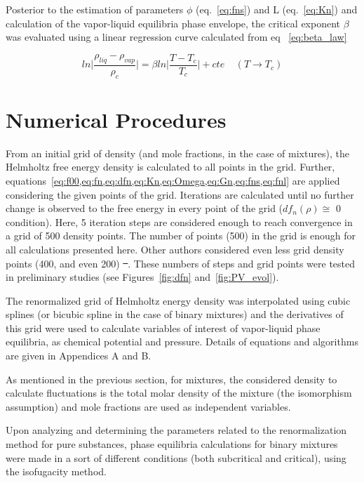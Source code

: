 \documentclass[preprint,12pt,3p]{elsarticle}
\providecommand{\DIFdel}[1]{{\protect\color{red}\sout{#1}}}                      %
\providecommand{\DIFdelbegin}{} %
\providecommand{\DIFdelend}{} %
\begin{document}
    Posterior to the estimation of parameters $\phi$ (eq.~\ref{eq:fns}) and L (eq.~\ref{eq:Kn}) and calculation of the vapor-liquid equilibria phase envelope, the critical exponent $\beta$ was evaluated using a linear regression curve calculated from eq ~\ref{eq:beta_law}

\begin{equation} \label{eq:beta_law}
    ln\Bigg|\frac{\rho_{liq}-\rho_{vap}}{\rho_{c}}\Bigg| = \beta ln\Bigg|\frac{T-T_{c}}{T_{c}}\Bigg|+cte \ \ \ \ \ (T \rightarrow T_{c})
\end{equation}

\section{Numerical Procedures}
    From an initial grid of density (and mole fractions, in the case of mixtures), the Helmholtz free energy density is calculated to all points in the grid. Further, equations~\cref{eq:f00,eq:fn,eq:dfn,eq:Kn,eq:Omega,eq:Gn,eq:fns,eq:fnl} are applied considering the given points of the grid. Iterations are calculated until no further change is observed to the free energy in every point of the grid ($df_{n}(\rho) \cong$ 0 condition). Here, 5 iteration steps are considered enough to reach convergence in a grid of 500 density points. The number of points (500) in the grid is enough for all calculations presented here. Other authors considered even less grid density points (400, and even 200) \DIFdelbegin \DIFdel{~}\DIFdelend \cite{cai2004thermodynamics}. These numbers of steps and grid points were tested in preliminary studies (see Figures~\ref{fig:dfn} and~\ref{fig:PV_evol}).

    The renormalized grid of Helmholtz energy density was interpolated using cubic splines (or bicubic spline in the case of binary mixtures) and the derivatives of this grid were used to calculate variables of interest of vapor-liquid phase equilibria, as chemical potential and pressure. Details of equations and algorithms are given in Appendices A and B.

    As mentioned in the previous section, for mixtures, the considered density to calculate fluctuations is the total molar density of the mixture (the isomorphism assumption) and mole fractions are used as independent variables.

    Upon analyzing and determining the parameters related to the renormalization method for pure substances, phase equilibria calculations for binary mixtures were made in a sort of different conditions (both subcritical and critical), using the isofugacity method.
\end{document}
